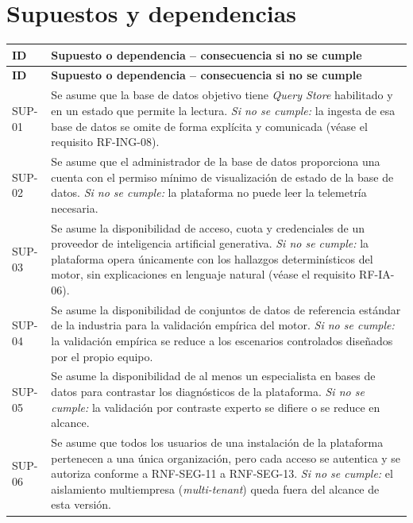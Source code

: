 \documentclass[11pt,a4paper]{report}
\begin{document}
\section{Supuestos y dependencias}

\begin{xltabular}{\linewidth}{@{}p{1.6cm}X@{}}
\toprule
\textbf{ID} & \textbf{Supuesto o dependencia -- consecuencia si no se cumple} \\
\midrule
\endfirsthead
\toprule
\textbf{ID} & \textbf{Supuesto o dependencia -- consecuencia si no se cumple} \\
\midrule
\endhead
\bottomrule
\endlastfoot
SUP-01 & Se asume que la base de datos objetivo tiene \textit{Query Store} habilitado y en un estado que permite la lectura. \textit{Si no se cumple:} la ingesta de esa base de datos se omite de forma expl\'icita y comunicada (v\'ease el requisito RF-ING-08). \\
SUP-02 & Se asume que el administrador de la base de datos proporciona una cuenta con el permiso m\'inimo de visualizaci\'on de estado de la base de datos. \textit{Si no se cumple:} la plataforma no puede leer la telemetr\'ia necesaria. \\
SUP-03 & Se asume la disponibilidad de acceso, cuota y credenciales de un proveedor de inteligencia artificial generativa. \textit{Si no se cumple:} la plataforma opera \'unicamente con los hallazgos determin\'isticos del motor, sin explicaciones en lenguaje natural (v\'ease el requisito RF-IA-06). \\
SUP-04 & Se asume la disponibilidad de conjuntos de datos de referencia est\'andar de la industria para la validaci\'on emp\'irica del motor. \textit{Si no se cumple:} la validaci\'on emp\'irica se reduce a los escenarios controlados dise\~nados por el propio equipo. \\
SUP-05 & Se asume la disponibilidad de al menos un especialista en bases de datos para contrastar los diagn\'osticos de la plataforma. \textit{Si no se cumple:} la validaci\'on por contraste experto se difiere o se reduce en alcance. \\
SUP-06 & Se asume que todos los usuarios de una instalaci\'on de la plataforma pertenecen a una \'unica organizaci\'on, pero cada acceso se autentica y se autoriza conforme a RNF-SEG-11 a RNF-SEG-13. \textit{Si no se cumple:} el aislamiento multiempresa (\textit{multi-tenant}) queda fuera del alcance de esta versi\'on. \\
\end{xltabular}
\end{document}

